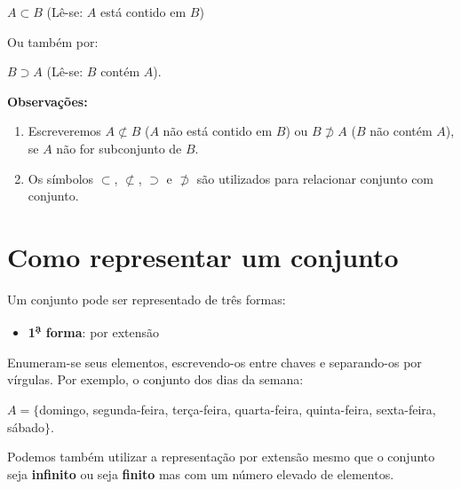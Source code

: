 \documentclass[11pt, openright, a4paper, brazil, english, french, spanish, bibjustif, openany, oneside]{abntex2}
\begin{document}
\begin{SingleSpace}
\begin{itemize}
{\begin{minipage}{14.7cm}
\begin{center}
$A \subset B$ (Lê-se: $A$ está contido em $B$)

\end{center}

Ou também por:

\begin{center}

$B \supset A$ (Lê-se: $B$ contém $A$).

\end{center}

\end{minipage}
}

\textbf{Observações:}

      \begin{enumerate}[label=\textbf{\arabic*\textsuperscript{\d a})}]
      
      \item Escreveremos $A \not\subset B$ ($A$ não está contido em $B$) ou $B \not\supset A$ ($B$ não contém $A$), se $A$ não for subconjunto de $B$.
      
      \item Os símbolos $\subset$, $\not\subset$, $\supset$ e $\not\supset$ são utilizados para relacionar conjunto com conjunto.
      
      \end{enumerate}
      
    

\end{itemize}


\section*{Como representar um conjunto}

Um conjunto pode ser representado de três formas:

\begin{itemize}

\item \textbf{1\textsuperscript{\d a} forma}: por extensão

\end{itemize}

Enumeram-se seus elementos, escrevendo-os entre chaves e separando-os por vírgulas. Por exemplo, o conjunto dos dias da semana:

$A=\{$domingo, segunda-feira, terça-feira, quarta-feira, quinta-feira, sexta-feira, sábado$\}$.

Podemos também utilizar a representação por extensão mesmo que o conjunto seja \textbf{infinito} ou seja \textbf{finito} mas com um número elevado de elementos.


\end{SingleSpace}
\end{document}
